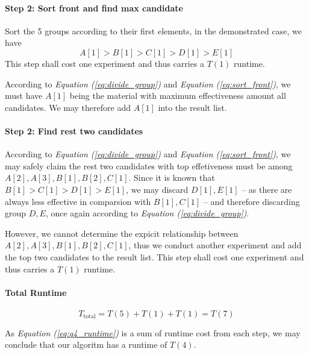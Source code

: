 \documentclass[11pt]{article}
\begin{document}
\paragraph{Step 2: Sort front and find max candidate\newline}
Sort the 5 groups according to their first elements, in the demonstrated case, we have
\begin{equation}
    A[1] > B[1] > C[1] > D[1] > E[1] \label{eq:sort_front}
\end{equation}
This step shall cost one experiment and thus carries a $T(1)$ runtime.


According to \textit{Equation (\ref{eq:divide_group})} and \textit{Equation (\ref{eq:sort_front})}, we must have $A[1]$ being the material with maximum effectiveness amount all candidates. We may therefore add $A[1]$ into the result list.


\paragraph{Step 2: Find rest two candidates\newline}

According to \textit{Equation (\ref{eq:divide_group})} and \textit{Equation (\ref{eq:sort_front})}, we may safely claim the rest two candidates with top effetiveness must be among $A[2], A[3], B[1], B[2], C[1]$. Since it is known that $B[1] > C[1] > D[1] > E[1]$, we may discard $D[1], E[1]$ -- as there are always less effective in comparsion with $B[1], C[1]$ -- and therefore discarding group $D, E$, once again according to \textit{Equation (\ref{eq:divide_group})}.

However, we cannot determine the expicit relationship between  $A[2], A[3], B[1], B[2], C[1]$, thus we conduct another experiment and add the top two candidates to the result list. This step shall cost one experiment and thus carries a $T(1)$ runtime.


\paragraph{Total Runtime}

\begin{equation}
    T_{\text{total}} = T(5) + T(1) + T(1) = T(7) \label{eq:q4_runtime}
\end{equation}

As \textit{Equation (\ref{eq:q4_runtime})} is a sum of runtime cost from each step, we may conclude that our algoritm has a runtime of $T(4)$.
\end{document}
